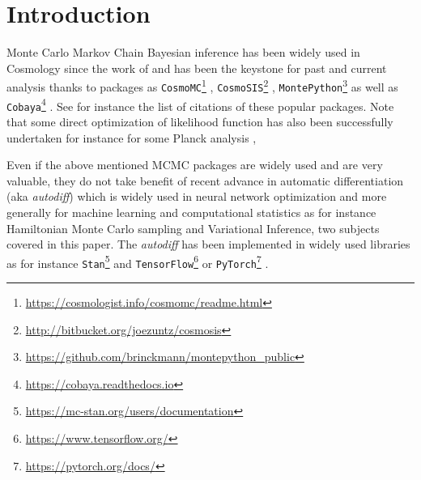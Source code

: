 \documentclass[final,5p,times,twocolumn,authoryear]{elsarticle}
\begin{document}


\section{Introduction}
Monte Carlo Markov Chain Bayesian inference has been widely used in Cosmology since the work of \citep{2001ApJ...563L..95K,2003MNRAS.341.1084R} and has been the keystone for past and current analysis thanks to packages as  \texttt{CosmoMC}\footnote{\url{https://cosmologist.info/cosmomc/readme.html}} \citep{2002PhRvD..66j3511L}, \texttt{CosmoSIS}\footnote{\url{http://bitbucket.org/joezuntz/cosmosis}} \citep{2015A&C....12...45Z}, \texttt{MontePython}\footnote{\url{https://github.com/brinckmann/montepython_public}} \citep{2019PDU....24..260B} as well as   \texttt{Cobaya}\footnote{\url{https://cobaya.readthedocs.io}} \citep{2019ascl.soft10019T,2021JCAP...05..057T}. See for instance the list of citations of these popular packages. Note that some direct optimization of likelihood function has also been successfully undertaken for instance for some Planck analysis \citep{2014A&A...566A..54P}, 

Even if the above mentioned MCMC packages are widely used and are very valuable, they do not take benefit of recent advance in automatic differentiation (aka \textit{autodiff}) \citep{2015arXiv150205767G, 2018arXiv181105031M} which is widely used in neural network optimization and more generally for machine learning and computational statistics as for instance Hamiltonian Monte Carlo sampling and Variational Inference, two subjects covered in this paper. The \textit{autodiff} has been implemented in widely used libraries as for instance \texttt{Stan}\footnote{\url{https://mc-stan.org/users/documentation}} \citep{JSSv076i01} and \texttt{TensorFlow}\footnote{\url{https://www.tensorflow.org/}}  \citep{tensorflow2015-whitepaper} or \texttt{PyTorch}\footnote{\url{https://pytorch.org/docs/}} \citep{NEURIPS2019_9015}. 
\end{document}
